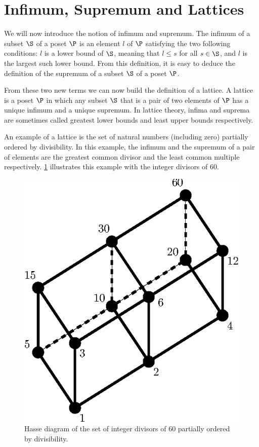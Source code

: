 \section{Infimum, Supremum and Lattices}
\label{tree:poset:lattices}

We will now introduce the notion of infimum and supremum. The infimum of a
subset \(\S\) of a poset \(\P\) is an element \(l\) of \(\P\) satisfying the two
following conditions: \(l\) is a lower bound of \(\S\), meaning that \(l \le
s\) for all \(s \in \S\), and \(l\) is the largest such lower bound. From this
definition, it is easy to deduce the definition of the supremum of a subset
\(\S\) of a poset \(\P\).

From these two new terms we can now build the definition of a lattice. A
lattice is a poset \(\P\) in which any subset \(\S\) that is a pair of two
elements of \(\P\) has a unique infimum and a unique supremum. In lattice
theory, infima and suprema are sometimes called greatest lower bounds and least
upper bounds respectively.

An example of a lattice is the set of natural numbers (including zero)
partially ordered by divisibility. In this example, the infimum and the
supremum of a pair of elements are the greatest common divisor and the least
common multiple respectively. \ref{fig:poset:lattice:60div} illustrates this
example with the integer divisors of \(60\).

\begin{figure}
\center
\includegraphics[height=0.2\textheight]{fig/poset/lattice/60div}
\caption{Hasse diagram of the set of integer divisors of \(60\) partially ordered by
divisibility.}\label{fig:poset:lattice:60div}
\end{figure}

